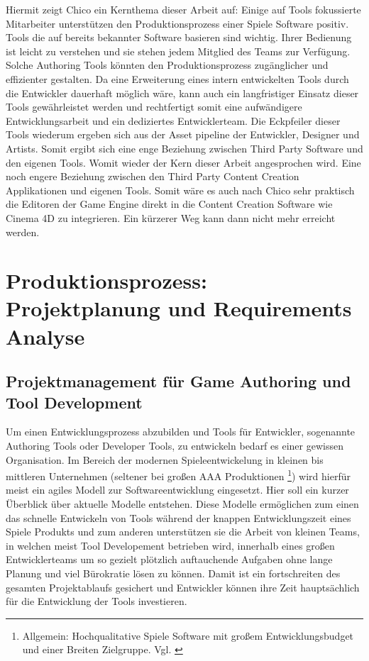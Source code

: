 \documentclass[pagesize, paper=a4, fontsize=12pt, titlepage=true, headings=small, headnosepline, abstractoff, liststotoc, nochapterprefix, plainheadsepline, twoside]{scrreprt}
\begin{document}
Hiermit zeigt Chico ein Kernthema dieser Arbeit auf: Einige auf Tools fokussierte Mitarbeiter unterstützen den Produktionsprozess einer Spiele Software positiv. Tools die auf bereits bekannter Software basieren sind wichtig. Ihrer Bedienung ist leicht zu verstehen und sie stehen jedem Mitglied des Teams zur Verfügung. Solche Authoring Tools könnten den Produktionsprozess zugänglicher und effizienter gestalten. Da eine Erweiterung eines intern entwickelten Tools durch die Entwickler dauerhaft möglich wäre, kann auch ein langfristiger Einsatz dieser Tools gewährleistet werden und rechtfertigt somit eine aufwändigere Entwicklungsarbeit und ein dediziertes Entwicklerteam. Die Eckpfeiler dieser Tools wiederum ergeben sich aus der Asset pipeline der Entwickler, Designer und Artists. Somit ergibt sich eine enge Beziehung zwischen Third Party Software und den eigenen Tools. Womit wieder der Kern dieser Arbeit angesprochen wird. Eine noch engere Beziehung zwischen den Third Party Content Creation Applikationen und eigenen Tools. Somit wäre es auch nach Chico sehr praktisch die Editoren der Game Engine direkt in die Content Creation Software wie Cinema 4D zu integrieren. Ein kürzerer Weg kann dann nicht mehr erreicht werden.


\chapter{Produktionsprozess: Projektplanung und Requirements Analyse}
\section{Projektmanagement für Game Authoring und Tool Development}
Um einen Entwicklungsprozess abzubilden und Tools für Entwickler, sogenannte Authoring Tools oder Developer Tools, zu entwickeln bedarf es einer gewissen Organisation. Im Bereich der modernen Spieleentwickelung in kleinen bis mittleren Unternehmen (seltener bei großen AAA Produktionen \footnote{Allgemein: Hochqualitative Spiele Software mit großem Entwicklungsbudget und einer Breiten Zielgruppe. Vgl. \cite{GamasutraAAA2005} }) wird hierfür meist ein agiles Modell zur Softwareentwicklung eingesetzt. Hier soll ein kurzer Überblick über aktuelle Modelle entstehen. Diese Modelle ermöglichen zum einen das schnelle Entwickeln von Tools während der knappen Entwicklungszeit eines Spiele Produkts und zum anderen unterstützen sie die Arbeit von kleinen Teams, in welchen meist Tool Developement betrieben wird,  innerhalb eines großen Entwicklerteams um so gezielt plötzlich auftauchende Aufgaben ohne lange Planung und viel Bürokratie lösen zu können. Damit ist ein fortschreiten des gesamten Projektablaufs gesichert und Entwickler können ihre Zeit hauptsächlich für die Entwicklung der Tools investieren.
\end{document}
